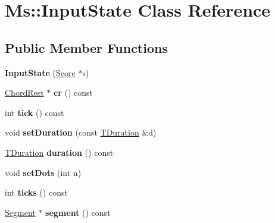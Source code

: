 \hypertarget{class_ms_1_1_input_state}{}\section{Ms\+:\+:Input\+State Class Reference}
\label{class_ms_1_1_input_state}
\subsection*{Public Member Functions}
\begin{DoxyCompactItemize}
\item 
\mbox{\label{class_ms_1_1_input_state_af4cdef5fad8b30b5e5af9cf887d3d574}} 
{\bfseries Input\+State} (\hyperlink{class_ms_1_1_score}{Score} $\ast$s)
\item 
\mbox{\label{class_ms_1_1_input_state_a28047eb7c30748dd3111c4621eb1ea4d}} 
\hyperlink{class_ms_1_1_chord_rest}{Chord\+Rest} $\ast$ {\bfseries cr} () const
\item 
\mbox{\label{class_ms_1_1_input_state_aa3abd178d6ac954c8e43eafae9e63f64}} 
int {\bfseries tick} () const
\item 
\mbox{\label{class_ms_1_1_input_state_a06f803b5c2481d3cb34019698a8861bd}} 
void {\bfseries set\+Duration} (const \hyperlink{class_ms_1_1_t_duration}{T\+Duration} \&d)
\item 
\mbox{\label{class_ms_1_1_input_state_ad23b3283d9647903d82a42461989506e}} 
\hyperlink{class_ms_1_1_t_duration}{T\+Duration} {\bfseries duration} () const
\item 
\mbox{\label{class_ms_1_1_input_state_a883decb4e4c2809a8de28830313d604c}} 
void {\bfseries set\+Dots} (int n)
\item 
\mbox{\label{class_ms_1_1_input_state_a09eff5b992567b8b2bd89488a51e2782}} 
int {\bfseries ticks} () const
\item 
\mbox{\label{class_ms_1_1_input_state_a50906efca36b635813b754bff9b32f15}} 
\hyperlink{class_ms_1_1_segment}{Segment} $\ast$ {\bfseries segment} () const

\end{DoxyCompactItemize}

